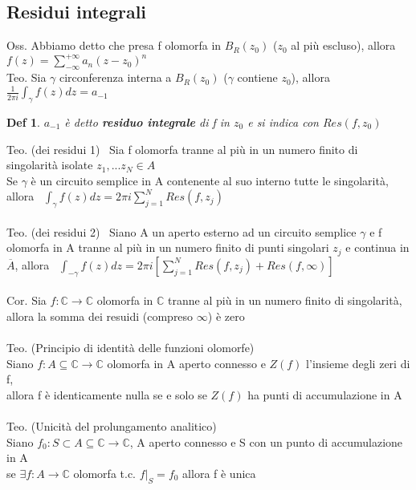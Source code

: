 \documentclass{article}
\theoremstyle{unnumbered}
\newtheorem* {theoremT}{Def}
\theoremstyle{unnumbered1}
\newenvironment{defi}{\begin{gBox}\begin{theoremT}}{\end{theoremT}\end{gBox}}
\begin{document}
\subsection{Residui integrali}
%
Oss. Abbiamo detto che presa f olomorfa in $B_R(z_0)$ ($z_0$ al più escluso), allora $f(z)=\sum_{-\infty}^{+\infty}a_n(z-z_0)^n $\\
%
Teo. Sia $\gamma$ circonferenza interna a $B_R(z_0)$ ($\gamma$ contiene $z_0$), allora $\frac{1}{2 \pi i}\int_{\gamma}f(z)dz=a_{-1}$\\
%
\begin{defi} 
$a_{-1}$ è detto \textbf{residuo integrale} di f in $z_0$ e si indica con $Res(f,z_0)$
\end{defi}
%
%
Teo. (dei residui 1) \ Sia f olomorfa tranne al più in un numero finito di singolarità isolate $z_1,...z_N \in A$ \\
Se $\gamma$ è un circuito semplice in A contenente al suo interno tutte le singolarità, allora \ $\int_{\gamma}f(z)dz=2\pi i \sum_{j=1}^N Res(f,z_j)$\\ \\
%
Teo. (dei residui 2) \ Siano A un aperto esterno ad un circuito semplice $\gamma$ e f olomorfa in A  tranne al più in un numero finito di punti singolari $z_j$ e continua in $\overline{A}$, allora \ $\int_{-\gamma}f(z)dz=2\pi i [\sum_{j=1}^N Res(f,z_j) + Res(f,\infty)]$\\ \\
%
Cor. Sia $f:\mathbb{C}\rightarrow\mathbb{C}$ olomorfa in $\mathbb{C}$ tranne al più in un numero finito di singolarità,\\ allora la somma dei resuidi (compreso $\infty$) è zero\\ \\
%
%
Teo. (Principio di identità delle funzioni olomorfe)\\
Siano $f:A\subseteq\mathbb{C}\rightarrow\mathbb{C}$ olomorfa in A aperto connesso e $Z(f)$ l'insieme degli zeri di f, \\ allora f è identicamente nulla se e solo se $Z(f)$ ha punti di accumulazione in A\\ \\
%
Teo. (Unicità del prolungamento analitico)\\
Siano $f_0:S\subset A\subseteq\mathbb{C}\rightarrow\mathbb{C}$, A aperto connesso e S con un punto di accumulazione in A\\ se $\exists f:A\rightarrow\mathbb{C}$ olomorfa t.c. $f|_S=f_0$ allora f è unica\\
%
\end{document}
